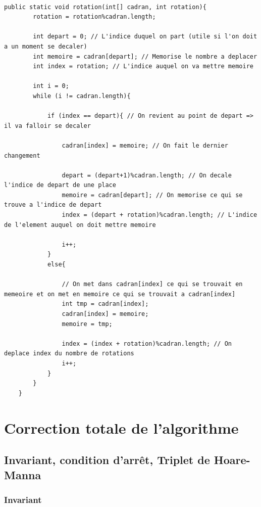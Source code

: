 \documentclass[a4paper, 12pt]{article}
\begin{document}
\begin{lstlisting}[frame=single]

public static void rotation(int[] cadran, int rotation){
        rotation = rotation%cadran.length;
        
        int depart = 0; // L'indice duquel on part (utile si l'on doit a un moment se decaler)
        int memoire = cadran[depart]; // Memorise le nombre a deplacer
        int index = rotation; // L'indice auquel on va mettre memoire
        
        int i = 0;
        while (i != cadran.length){
            
            if (index == depart){ // On revient au point de depart => il va falloir se decaler
                
                cadran[index] = memoire; // On fait le dernier changement

                depart = (depart+1)%cadran.length; // On decale l'indice de depart de une place
                memoire = cadran[depart]; // On memorise ce qui se trouve a l'indice de depart
                index = (depart + rotation)%cadran.length; // L'indice de l'element auquel on doit mettre memoire
                
                i++;
            }
            else{
                
                // On met dans cadran[index] ce qui se trouvait en memeoire et on met en memoire ce qui se trouvait a cadran[index]
                int tmp = cadran[index];
                cadran[index] = memoire;
                memoire = tmp;
                
                index = (index + rotation)%cadran.length; // On deplace index du nombre de rotations
                i++;
            }
        }
	}

\end{lstlisting} 

\section{Correction totale de l'algorithme}
\subsection{Invariant, condition d'arrêt, Triplet de Hoare-Manna}
\subsubsection*{Invariant}
\end{document}
